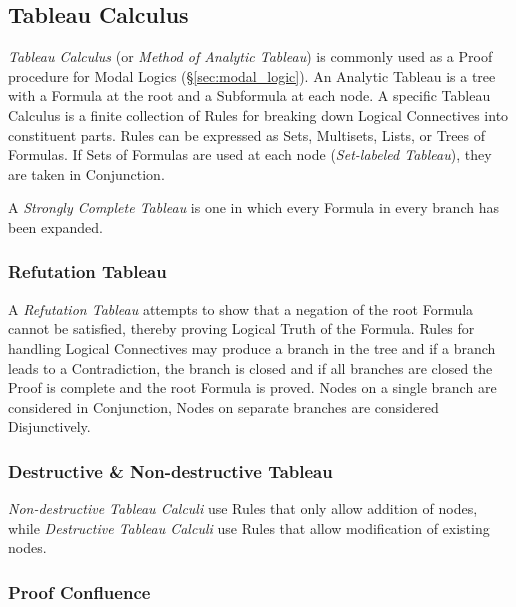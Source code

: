 \subsection{Tableau Calculus}\label{sec:tableau_calculus}

\emph{Tableau Calculus} (or \emph{Method of Analytic Tableau}) is
commonly used as a Proof procedure for Modal Logics
(\S\ref{sec:modal_logic}). An Analytic Tableau is a tree with a
Formula at the root and a Subformula at each node. A specific Tableau
Calculus is a finite collection of Rules for breaking down Logical
Connectives into constituent parts. Rules can be expressed as Sets,
Multisets, Lists, or Trees of Formulas. If Sets of Formulas are used
at each node (\emph{Set-labeled Tableau}), they are taken in
Conjunction.

A \emph{Strongly Complete Tableau} is one in which every Formula in
every branch has been expanded.



\subsubsection{Refutation Tableau}\label{sec:refutation_tableau}

A \emph{Refutation Tableau} attempts to show that a negation of the
root Formula cannot be satisfied, thereby proving Logical Truth of the
Formula. Rules for handling Logical Connectives may produce a branch
in the tree and if a branch leads to a Contradiction, the branch is
closed and if all branches are closed the Proof is complete and the
root Formula is proved. Nodes on a single branch are considered in
Conjunction, Nodes on separate branches are considered Disjunctively.



\subsubsection{Destructive \& Non-destructive Tableau}
\label{sec:destructive_tableau}

\emph{Non-destructive Tableau Calculi} use Rules that only allow
addition of nodes, while \emph{Destructive Tableau Calculi} use Rules
that allow modification of existing nodes.



\subsubsection{Proof Confluence} \label{sec:proof_confluence}

